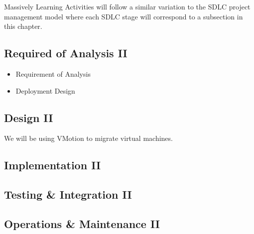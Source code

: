 Massively Learning Activities will follow a similar variation to the SDLC project management model where each SDLC stage will correspond to a subsection in this chapter. 

\subsection{Required of Analysis II}
\begin{itemize}
    \item Requirement of Analysis
    \item Deployment Design
\end{itemize}

\subsection{Design II}
We will be using VMotion to migrate virtual machines. 

\subsection{Implementation II}

\subsection{Testing \& Integration II}

\subsection{Operations \& Maintenance II}


